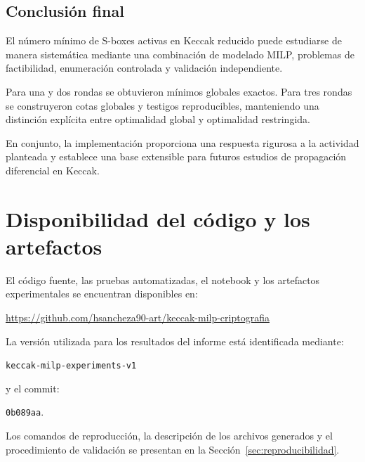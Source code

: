 \subsection{Conclusión final}
\label{subsec:conclusion_final}

El número mínimo de S-boxes activas en Keccak reducido puede estudiarse de
manera sistemática mediante una combinación de modelado MILP, problemas de
factibilidad, enumeración controlada y validación independiente.

Para una y dos rondas se obtuvieron mínimos globales exactos. Para tres
rondas se construyeron cotas globales y testigos reproducibles, manteniendo
una distinción explícita entre optimalidad global y optimalidad restringida.

En conjunto, la implementación proporciona una respuesta rigurosa a la
actividad planteada y establece una base extensible para futuros estudios
de propagación diferencial en Keccak.


\section*{Disponibilidad del código y los artefactos}
\label{sec:disponibilidad_codigo}

El código fuente, las pruebas automatizadas, el notebook y los artefactos
experimentales se encuentran disponibles en:

\begin{center}
\url{https://github.com/hsancheza90-art/keccak-milp-criptografia}
\end{center}

La versión utilizada para los resultados del informe está identificada
mediante:

\begin{center}
\texttt{keccak-milp-experiments-v1}
\end{center}

y el commit:

\begin{center}
\texttt{0b089aa}.
\end{center}

Los comandos de reproducción, la descripción de los archivos generados y
el procedimiento de validación se presentan en la
Sección~\ref{sec:reproducibilidad}.